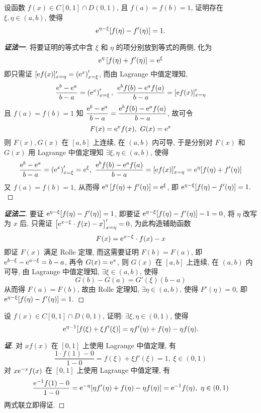 \begin{example}
    设函数 $f(x)\in C[0,1]\cap D(0,1)$, 且 $f(a)=f(b)=1$, 证明存在 $\xi,\eta\in(a,b)$, 使得 $$\mathrm{e} ^{\eta-\xi}[f(\eta)-f'(\eta)]=1.$$
\end{example}
\begin{proof}[{\songti \textbf{证法一}}]
    将要证明的等式中含 $\xi$ 和 $\eta$ 的项分别放到等式的两侧, 化为
    $$\mathrm{e} ^{\eta }\left[ f(\eta)  +f'(\eta)  \right] =\mathrm{e} ^{\xi }$$
    即只需证 $[\mathrm{e} f(x)]'_{x=\eta}=\left(\mathrm{e} ^x\right)'_{x=\xi}$, 而由 Lagrange 中值定理知, 
    $$\dfrac{\mathrm{e} ^b-\mathrm{e} ^a}{b-a}=\left(\mathrm{e} ^x\right)'_{x=\xi},~\dfrac{\mathrm{e} ^bf(b)-\mathrm{e} ^af(a)}{b-a}=[\mathrm{e} f(x)]'_{x=\eta}$$
    且 $f(a)=f(b)=1$ 知 $\dfrac{\mathrm{e} ^b-\mathrm{e} ^a}{b-a}=\dfrac{\mathrm{e} ^bf(b)-\mathrm{e} ^af(a)}{b-a}$, 故可令
    $$F(x)=\mathrm{e} ^xf(x),~G(x)=\mathrm{e} ^x$$
    则 $F(x),G(x)$ 在 $[a,b]$ 上连续, 在 $(a,b)$ 内可导, 于是分别对 $F(x)$ 和 $G(x)$ 用 Lagrange 中值定理知
    $\exists\xi,\eta\in(a,b)\text{, 使得 }$
    $$\dfrac{\mathrm{e} ^b-\mathrm{e} ^a}{b-a}=\left(\mathrm{e} ^x\right)'_{x=\xi}=\mathrm{e} ^\xi,~\dfrac{\mathrm{e} ^bf(b)-\mathrm{e} ^af(a)}{b-a}=[\mathrm{e} f(x)]'_{x=\eta}=\mathrm{e} ^\eta[f(\eta)+f'(\eta)]$$
    又 $f(a)=f(b)=1$, 从而得 $\mathrm{e} ^{\eta }\left[ f(\eta)  +f'(\eta)  \right] =\mathrm{e} ^{\xi }$, 即 $\mathrm{e} ^{\eta-\xi}[f(\eta)-f'(\eta)]=1.$
\end{proof}
\begin{proof}[{\songti \textbf{证法二}}]
    要证 $\mathrm{e} ^{\eta-\xi}[f(\eta)-f'(\eta)]=1$, 即要证 $\mathrm{e} ^{\eta-\xi}[f(\eta)-f'(\eta)]-1=0$, 将 $\eta$ 改写为 $x$ 后, 
    只需证 $\left[\mathrm{e} ^{x-\xi}\cdot f(x)-x\right]'_{x=\eta}=0$, 为此构造辅助函数
    $$F(x)=\mathrm{e} ^{x-\xi}\cdot f(x)-x$$
    即证 $F(x)$ 满足 Rolle 定理, 而这需要证明 $F(b)=F(a)$, 即 $\mathrm{e} ^{b-\xi}-\mathrm{e} ^{a-\xi}=b-a$, 
    再令 $G(x)=\mathrm{e} ^x$, 则 $G(x)$ 在 $[a,b]$ 上连续, 在 $(a,b)$ 内可导, 由 Lagrange 中值定理知, $\exists\xi\in(a,b)\text{, 使得 }$
    $$G(b)-G(a)=G'(\xi)(b-a)$$
    从而得 $F(a)=F(b)$, 故由 Rolle 定理知, $\exists\eta\in(a,b)\text{, 使得 }F'(\eta)=0$, 
    即 $\mathrm{e} ^{\eta-\xi}[f(\eta)-f'(\eta)]=1.$
\end{proof}

\begin{example}
    设 $f(x)\in C[0,1]\cap D(0,1)$, 证明: $\exists\xi,\eta\in(0,1)$, 使得 $$\mathrm{e}^{\eta-1}\qty[f(\xi)+\xi f'(\xi)]=\eta f'(\eta)+f(\eta)-\eta f(\eta).$$
\end{example}
\begin{proof}[{\songti \textbf{证}}]
    对 $xf(x)$ 在 $[0,1]$ 上使用 Lagrange 中值定理, 有
    $$\dfrac{1\cdot f(1)-0}{1-0}=f(\xi)+\xi f'(\xi)=1,~\xi\in(0,1)$$
    对 $x\mathrm{e}^{-x}f(x)$ 在 $[0,1]$ 上使用 Lagrange 中值定理, 有
    $$\dfrac{\mathrm{e}^{-1}f(1)-0}{1-0}=\mathrm{e}^{-\eta}\qty[\eta f'(\eta)+f(\eta)-\eta f(\eta)]=\mathrm{e}^{-1}f(\eta),~\eta\in(0,1)$$
    两式联立即得证.
\end{proof}

